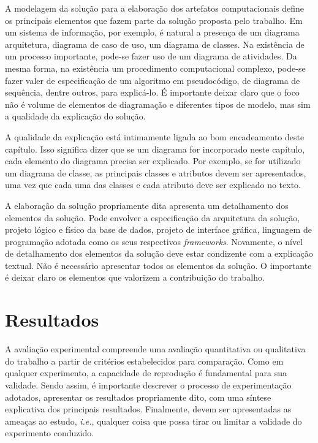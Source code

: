 \documentclass[12pt]{tcc}
\begin{document}
A modelagem da solução para a elaboração dos artefatos computacionais define os principais elementos que fazem parte da solução proposta pelo trabalho. Em um sistema de informação, por exemplo, é natural a presença de um diagrama arquitetura, diagrama de caso de uso, um diagrama de classes. Na existência de um processo importante, pode-se fazer uso de um diagrama de atividades. Da mesma forma, na existência um procedimento computacional complexo, pode-se fazer valer de especificação de um algoritmo em pseudocódigo, de diagrama de sequência, dentre outros, para explicá-lo. É importante deixar claro que o foco não é volume de elementos de diagramação e diferentes tipos de modelo, mas sim a qualidade da explicação do solução.

A qualidade da explicação está intimamente ligada ao bom encadeamento deste capítulo. Isso significa dizer que se um diagrama for incorporado neste capítulo, cada elemento do diagrama precisa ser explicado. Por exemplo, se for utilizado um diagrama de classe, as principais classes e atributos devem ser apresentados, uma vez que cada uma das classes e cada atributo deve ser explicado no texto.

A elaboração da solução propriamente dita apresenta um detalhamento dos elementos da solução. Pode envolver a especificação da arquitetura da solução, projeto lógico e físico da base de dados, projeto de interface gráfica, linguagem de programação adotada como os seus respectivos \emph{frameworks}. Novamente, o nível de detalhamento dos elementos da solução deve estar condizente com a explicação textual. Não é necessário apresentar todos os elementos da solução. O importante é deixar claro os elementos que valorizem a contribuição do trabalho.

\chapter{Resultados}
\label{sec:aval_exp}

A avaliação experimental compreende uma avaliação quantitativa ou qualitativa do trabalho a partir de critérios estabelecidos para comparação. Como em qualquer experimento, a capacidade de reprodução é fundamental para sua validade. Sendo assim, é importante descrever o processo de experimentação adotados, apresentar os resultados propriamente dito, com uma síntese explicativa dos principais resultados. Finalmente, devem ser apresentadas as ameaças ao estudo, \emph{i.e.}, qualquer coisa que possa tirar ou limitar a validade do experimento conduzido. 
\end{document}
